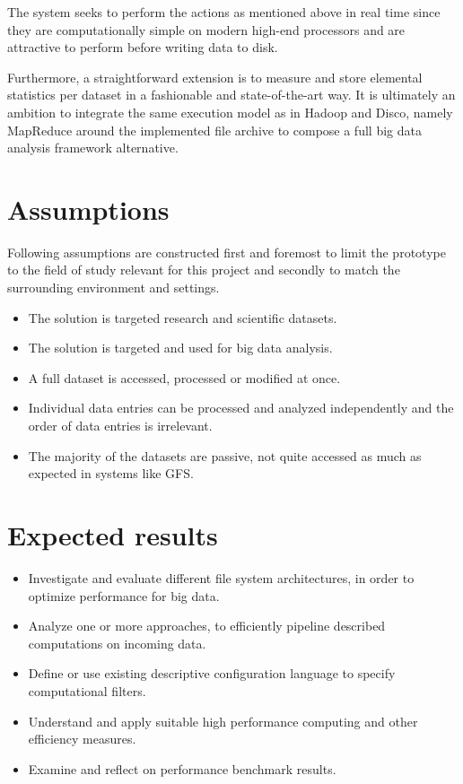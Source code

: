 The system seeks to perform the actions as mentioned above in real time since they are computationally simple on modern high-end processors and are attractive to perform before writing data to disk. 
\newline

Furthermore, a straightforward extension is to measure and store elemental statistics per dataset in a fashionable and state-of-the-art way. It is ultimately an ambition to integrate the same execution model as in \eg Hadoop and Disco, namely MapReduce around the implemented file archive to compose a full big data analysis framework alternative.

\section{Assumptions} \label{sec:assumption}
Following assumptions are constructed first and foremost to limit the prototype to the field of study relevant for this project and secondly to match the surrounding environment and settings.

\begin{itemize}
	\item The solution is targeted research and scientific datasets. 
	\item The solution is targeted and used for big data analysis.
	\item A full dataset is accessed, processed or modified at once.
	\item Individual data entries can be processed and analyzed independently and the order of data entries is irrelevant.
	\item The majority of the datasets are passive, \eg not quite accessed as much as expected in systems like GFS.
\end{itemize}

\section{Expected results} \label{sec:expected-results}
\begin{itemize}
	\item Investigate and evaluate different file system architectures, in order to optimize performance for big data.	
	\item Analyze one or more approaches, to efficiently pipeline described computations on incoming data.
	\item Define or use existing descriptive configuration language to specify computational filters.
	\item Understand and apply suitable high performance computing and other efficiency measures.
	\item Examine and reflect on performance benchmark results.
\end{itemize}

\section{}

